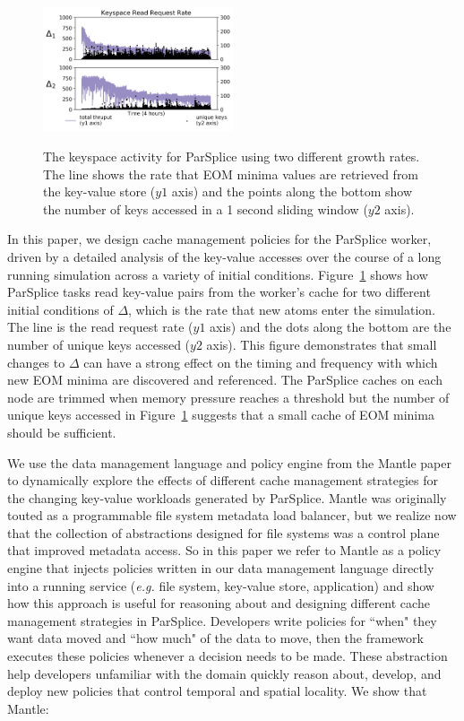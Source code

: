 \begin{figure}[t]
  \noindent\includegraphics[width=0.5\textwidth]{figures/motivation-regimes.png}\\
  \caption{The keyspace activity for ParSplice using two different growth
rates.  The line shows the rate that EOM minima values are retrieved from the
key-value store (\(y1\) axis) and the points along the bottom show the number
of keys accessed in a 1 second sliding window (\(y2\) axis).
\label{fig:motivation-regimes}}
\end{figure}

In this paper, we design cache management policies for the ParSplice worker,
driven by a detailed analysis of the key-value accesses over the course of a
long running simulation across a variety of initial conditions.
Figure~\ref{fig:motivation-regimes} shows how ParSplice tasks read key-value
pairs from the worker's cache for two different initial conditions of
\(\Delta\), which is the rate that new atoms enter the simulation.  The line is
the read request rate (\(y1\) axis) and the dots along the bottom are the
number of unique keys accessed (\(y2\) axis).  This figure demonstrates that
small changes to \(\Delta\) can have a strong effect on the timing and
frequency with which new EOM minima are discovered and referenced.  The
ParSplice caches on each node are trimmed when memory pressure reaches a
threshold but the number of unique keys accessed in
Figure~\ref{fig:motivation-regimes} suggests that a small cache of EOM minima
should be sufficient. 

We use the data management language and policy engine from the Mantle
paper~\cite{sevilla:sc15-mantle} to dynamically explore the effects of
different cache management strategies for the changing key-value workloads
generated by ParSplice.  Mantle was originally touted as a programmable file
system metadata load balancer, but we realize now that the collection of
abstractions designed for file systems was a control plane that improved
metadata access. So in this paper we refer to Mantle as a policy engine that
injects policies written in our data management language directly into a
running service ({\it e.g.} file system, key-value store, application) and show
how this approach is useful for reasoning about and designing different cache
management strategies in ParSplice. Developers write policies for ``when" they
want data moved and ``how much" of the data to move, then the framework
executes these policies whenever a decision needs to be made.  These
abstraction help developers unfamiliar with the domain quickly reason about,
develop, and deploy new policies that control temporal and spatial locality. We
show that Mantle:

